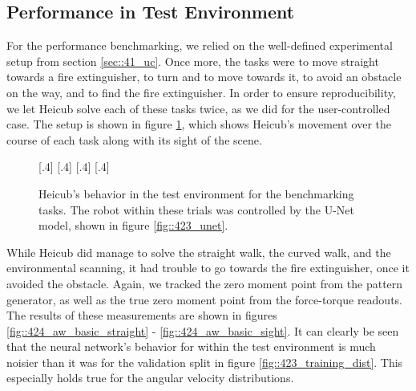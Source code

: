 \subsection{Performance in Test Environment}
\label{sec::424_pt}
For the performance benchmarking, we relied on the well-defined experimental setup from section \ref{sec::41_uc}. Once more, the tasks were to move straight towards a fire extinguisher, to turn and to move towards it, to avoid an obstacle on the way, and to find the fire extinguisher. In order to ensure reproducibility, we let Heicub solve each of these tasks twice, as we did for the user-controlled case. The setup is shown in figure \ref{fig::424_aw_gif_basic}, which shows Heicub's movement over the course of each task along with its sight of the scene.
\begin{figure}[h!]
	\centering
	[.4\linewidth]{}
	[.4\linewidth]{}
	[.4\linewidth]{}
	[.4\linewidth]{}
	\caption{Heicub's behavior in the test environment for the benchmarking tasks. The robot within these trials was controlled by the U-Net model, shown in figure \ref{fig::423_unet}.}
	\label{fig::424_aw_gif_basic}
\end{figure} 
While Heicub did manage to solve the straight walk, the curved walk, and the environmental scanning, it had trouble to go towards the fire extinguisher, once it avoided the obstacle. Again, we tracked the zero moment point from the pattern generator, as well as the true zero moment point from the force-torque readouts. The results of these measurements are shown in figures \ref{fig::424_aw_basic_straight} - \ref{fig::424_aw_basic_sight}. It can clearly be seen that the neural network's behavior for within the test environment is much noisier than it was for the validation split in figure \ref{fig::423_training_dist}. This especially holds true for the angular velocity distributions. 
